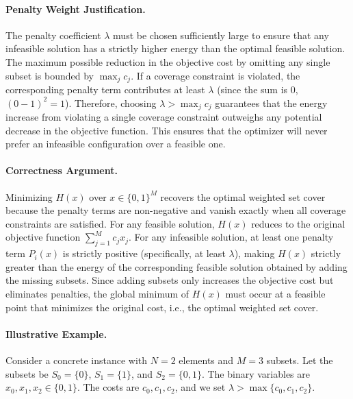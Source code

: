 \documentclass[12pt]{article}
\begin{document}
\paragraph{Penalty Weight Justification.}
The penalty coefficient $\lambda$ must be chosen sufficiently large to ensure that any infeasible solution has a strictly higher energy than the optimal feasible solution. The maximum possible reduction in the objective cost by omitting any single subset is bounded by $\max_{j} c_j$. If a coverage constraint is violated, the corresponding penalty term contributes at least $\lambda$ (since the sum is $0$, $(0-1)^2 = 1$). Therefore, choosing $\lambda > \max_{j} c_j$ guarantees that the energy increase from violating a single coverage constraint outweighs any potential decrease in the objective function. This ensures that the optimizer will never prefer an infeasible configuration over a feasible one.

\paragraph{Correctness Argument.}
Minimizing $H(x)$ over $x \in \{0,1\}^M$ recovers the optimal weighted set cover because the penalty terms are non-negative and vanish exactly when all coverage constraints are satisfied. For any feasible solution, $H(x)$ reduces to the original objective function $\sum_{j=1}^M c_j x_j$. For any infeasible solution, at least one penalty term $P_i(x)$ is strictly positive (specifically, at least $\lambda$), making $H(x)$ strictly greater than the energy of the corresponding feasible solution obtained by adding the missing subsets. Since adding subsets only increases the objective cost but eliminates penalties, the global minimum of $H(x)$ must occur at a feasible point that minimizes the original cost, i.e., the optimal weighted set cover.

\paragraph{Illustrative Example.}
Consider a concrete instance with $N=2$ elements and $M=3$ subsets. Let the subsets be $S_0 = \{0\}$, $S_1 = \{1\}$, and $S_2 = \{0, 1\}$. The binary variables are $x_0, x_1, x_2 \in \{0,1\}$. The costs are $c_0, c_1, c_2$, and we set $\lambda > \max\{c_0, c_1, c_2\}$.
\end{document}
